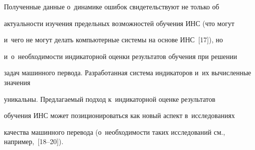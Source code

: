   


  Полученные данные о~динамике ошибок свидетельствуют не только об 


актуальности изучения предельных возможностей обучения ИНС (что могут 


и~чего не могут делать компьютерные системы на основе ИНС~[17]), но 


и~о~необходимости индикаторной оценки результатов обучения при решении 


задач машинного первода. Разработанная система индикаторов и~их вычисленные значения 


уникальны. Предлагаемый подход к~индикаторной оценке результатов 


обучения ИНС может позиционироваться как новый аспект в~исследованиях 


качества машинного перевода (о~необходимости таких исследований см., например,~[18--20]).





